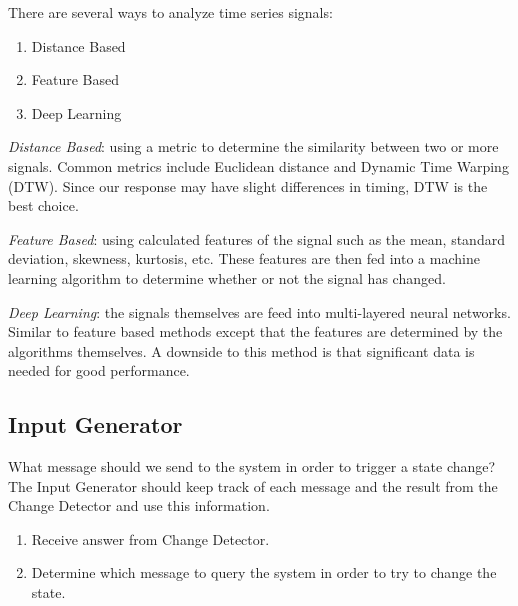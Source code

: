 \documentclass[11pt, a4paper]{article}
\begin{document}
There are several ways to analyze time series signals:
\begin{enumerate}
    \item Distance Based
    \item Feature Based
    \item Deep Learning
\end{enumerate}

\textit{Distance Based}: using a metric to determine the similarity between two or more signals.
Common metrics include Euclidean distance and Dynamic Time Warping (DTW).
Since our response may have slight differences in timing, DTW is the best choice.

\textit{Feature Based}: using calculated features of the signal such as the mean, standard deviation, skewness, kurtosis, etc.
These features are then fed into a machine learning algorithm to determine whether or not the signal has changed.

\textit{Deep Learning}: the signals themselves are feed into multi-layered neural networks.
Similar to feature based methods except that the features are determined by the algorithms themselves.
A downside to this method is that significant data is needed for good performance.



\subsection*{Input Generator}

What message should we send to the system in order to trigger a state change?
The Input Generator should keep track of each message and the result from the Change Detector and use this information.

\begin{enumerate}
    \item Receive answer from Change Detector.
    \item Determine which message to query the system in order to try to change the state.
\end{enumerate}
\end{document}
